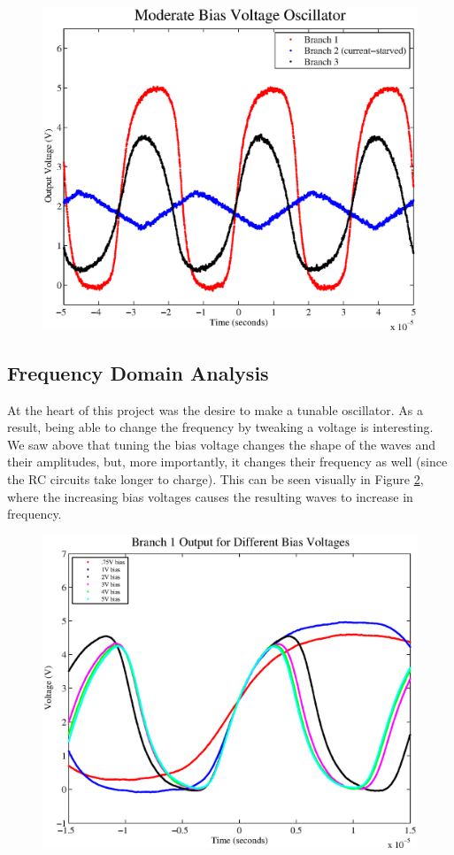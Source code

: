 \documentclass{article}
\begin{document}
\begin{figure}[H]
\centering
\includegraphics[scale=.6]{moderate_bias.eps}
\caption{}
\label{moderateBias}
\end{figure}

\subsection*{Frequency Domain Analysis}

At the heart of this project was the desire to make a tunable oscillator. As a result, being able to change the frequency by tweaking a voltage is interesting.  We saw above that tuning the bias voltage changes the shape of the waves and their amplitudes, but, more importantly, it changes their frequency as well (since the RC circuits take longer to charge).  This can be seen visually in Figure \ref{branch}, where the increasing bias voltages causes the resulting waves to increase in frequency.

\begin{figure}[H]
\centering
\includegraphics[scale=.6]{b1_out.eps}
\caption{}
\label{branch}
\end{figure}
\end{document}

